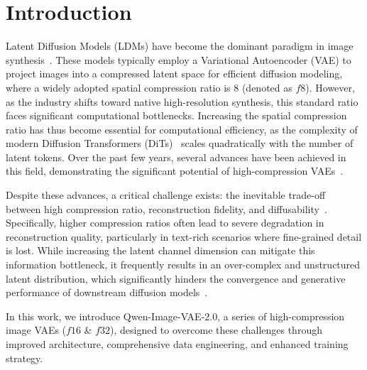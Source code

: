 \section{Introduction}
Latent Diffusion Models (LDMs) have become the dominant paradigm in image synthesis~\citep{rombach2022high, flux2024, qwenimage, sd3, seedream3, qwen-image-2.0}. These models typically employ a Variational Autoencoder (VAE) to project images into a compressed latent space for efficient diffusion modeling, where a widely adopted spatial compression ratio is 8 (denoted as $f8$). However, as the industry shifts toward native high-resolution synthesis, this standard ratio faces significant computational bottlenecks. Increasing the spatial compression ratio has thus become essential for computational efficiency, as the complexity of modern Diffusion Transformers (DiTs)~\citep{dit} scales quadratically with the number of latent tokens. Over the past few years, several advances have been achieved in this field, demonstrating the significant potential of high-compression VAEs~\citep{ltx, dcae, cosmos, dcae1.5}.


Despite these advances, a critical challenge exists: the inevitable trade-off between high compression ratio, reconstruction fidelity, and diffusability~\citep{diffusability}. Specifically, higher compression ratios often lead to severe degradation in reconstruction quality, particularly in text-rich scenarios where fine-grained detail is lost. While increasing the latent channel dimension can mitigate this information bottleneck, it frequently results in an over-complex and unstructured latent distribution, which significantly hinders the convergence and generative performance of downstream diffusion models~\citep{vavae, qiu2025image}.

In this work, we introduce Qwen-Image-VAE-2.0, a series of high-compression image VAEs ($f16$ \& $f32$), designed to overcome these challenges through improved architecture, comprehensive data engineering, and enhanced training strategy.

